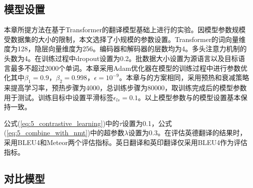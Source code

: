 \subsection{模型设置}
\label{sec:5_model_setup}

本章所提方法在基于Transformer的翻译模型基础上进行的实验。因模型参数规模受数据集的大小的限制，本文选择了小规模的参数设置。Transformer的词向量维度为128，隐层向量维度为256。编码器和解码器的层数均为4。多头注意力机制的头数为4。在训练过程中dropout设置为0.2。批数据大小设置为源语言以及目标语言最多不超过2000个单词。本章采用Adam优化器在模型的训练过程中进行参数优化其中$\beta_1=0.9$，$\beta_2=0.998$，$\epsilon=10^{-9}$。本章与的方案相同，采用预热和衰减策略来提高学习率，预热步骤为4000，总训练步骤为80000，取训练完成后的模型参数用于测试。训练目标中设置平滑标签$\epsilon_{ls}=0.1$。以上模型参数与的模型设置基本保持一致。

公式(\ref{eq:5_contrastive_learning})中的$\tau$设置为0.1，公式(\ref{eq:5_combine_with_nmt})中的超参数$\lambda$设置为0.3。在评估英德翻译的结果时，采用BLEU4和Meteor两个评估指标。英日翻译和英印翻译仅采用BLEU4作为评估指标。

\subsection{对比模型}


